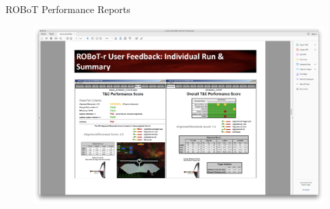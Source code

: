 \documentclass[10pt]{beamer}
\begin{document}

\begin{frame}[fragile]{ROBoT Performance Reports}
\begin{figure}
  \begin{center}
    \includegraphics[trim={13cm 5cm 22cm 15.5cm},clip,width=\linewidth]{../img/Screen_Shot_2018-07-26_at_1.43.07_PM.png}
  \end{center}
\end{figure}
\end{frame}

\end{document}

